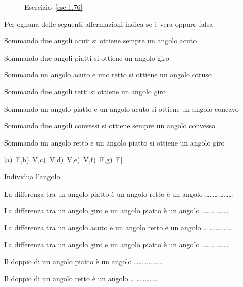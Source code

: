 \begin{inaccessibleblock}
 \begin{figure}[htb]
 \centering
 \caption{Esercizio~\ref{ese:1.76}}\label{fig:ese1.76}
\end{figure}
\end{inaccessibleblock}

\begin{esercizio}
\label{ese:1.77}
Per ognuna delle seguenti affermazioni indica se è vera oppure falsa
\begin{enumeratea}
\item Sommando due angoli acuti si ottiene sempre un angolo 
acuto		\hfill\boxV\quad\boxF
\item Sommando due angoli piatti si ottiene un angolo giro	
			\hfill\boxV\quad\boxF
\item Sommando un angolo acuto e uno retto si ottiene un angolo 
ottuso	\hfill\boxV\quad\boxF
\item Sommando due angoli retti si ottiene un angolo giro	
			\hfill\boxV\quad\boxF
\item Sommando un angolo piatto e un angolo acuto si ottiene un 
angolo concavo	\hfill\boxV\quad\boxF
\item Sommando due angoli convessi si ottiene sempre un angolo 
convesso	\hfill\boxV\quad\boxF
\item Sommando un angolo retto e un angolo piatto si ottiene un 
angolo giro		\hfill\boxV\quad\boxF
\end{enumeratea}
\hfill[a)~F,\quad b)~V,\quad c)~V,\quad d)~V,\quad e)~V,\quad f)~F,\quad g)~F]
\end{esercizio}

\begin{esercizio}
\label{ese:1.78}
Individua l'angolo
\begin{enumeratea}
\item La differenza tra un angolo piatto è un angolo retto è un 
angolo \ldots\ldots\ldots\ldots\ldots\ldots{}
\item La differenza tra un angolo giro e un angolo piatto è un angolo 
\ldots\ldots\ldots\ldots\ldots\ldots{}
\item La differenza tra un angolo acuto e un angolo retto è un angolo 
\ldots\ldots\ldots\ldots\ldots\ldots{}
\item La differenza tra un angolo giro e un angolo piatto è un angolo 
\ldots\ldots\ldots\ldots\ldots\ldots{}
\item Il doppio di un angolo piatto è un angolo 
\ldots\ldots\ldots\ldots\ldots\ldots{}
\item Il doppio di un angolo retto è un angolo 
\ldots\ldots\ldots\ldots\ldots\ldots{}
\end{enumeratea}
\end{esercizio}
	
